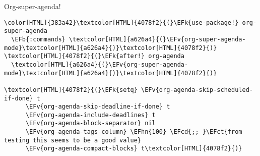 \documentclass{scrartcl}
\newcommand{\EFk}[1]{\textcolor{EFk}{#1}} %
\newcommand{\EFb}[1]{\textcolor{EFb}{#1}} %
\newcommand{\EFct}[1]{\textcolor{EFct}{#1}} %
\newcommand{\EFv}[1]{\textcolor{EFv}{#1}} %
\newcommand{\EFcd}[1]{\textcolor{EFcd}{#1}} %
\newcommand{\EFhn}[1]{\textcolor{EFhn}{\textbf{#1}}} %
\begin{document}
Org-super-agenda!
\begin{Code}
\begin{Verbatim}[]
\color[HTML]{383a42}\textcolor[HTML]{4078f2}{(}\EFk{use-package!} org-super-agenda
  \EFb{:commands} \textcolor[HTML]{a626a4}{(}\EFv{org-super-agenda-mode}\textcolor[HTML]{a626a4}{)}\textcolor[HTML]{4078f2}{)}
\textcolor[HTML]{4078f2}{(}\EFk{after!} org-agenda
  \textcolor[HTML]{a626a4}{(}\EFv{org-super-agenda-mode}\textcolor[HTML]{a626a4}{)}\textcolor[HTML]{4078f2}{)}

\textcolor[HTML]{4078f2}{(}\EFk{setq} \EFv{org-agenda-skip-scheduled-if-done} t
      \EFv{org-agenda-skip-deadline-if-done} t
      \EFv{org-agenda-include-deadlines} t
      \EFv{org-agenda-block-separator} nil
      \EFv{org-agenda-tags-column} \EFhn{100} \EFcd{;; }\EFct{from testing this seems to be a good value}
      \EFv{org-agenda-compact-blocks} t\textcolor[HTML]{4078f2}{)}


\end{Verbatim}
\end{Code}
\end{document}
